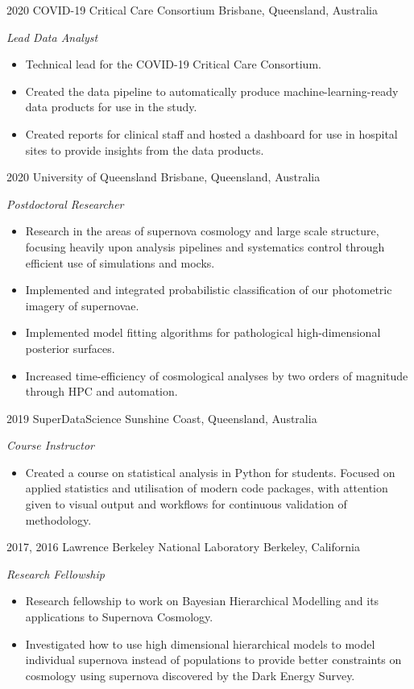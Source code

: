 \begin{entrylist}

\entry
{2020}
{COVID-19 Critical Care Consortium}
{Brisbane, Queensland, Australia}
{\emph{Lead Data Analyst}
\begin{itemize}
	\item Technical lead for the COVID-19 Critical Care Consortium. 
	\item Created the data pipeline to automatically produce machine-learning-ready data products for use in the study. 
	\item Created reports for clinical staff and hosted a dashboard for use in hospital sites to provide insights from the data products.
\end{itemize}
}

\entry
{2020}
{University of Queensland}
{Brisbane, Queensland, Australia}
{\emph{Postdoctoral Researcher}
\begin{itemize}
\item Research in the areas of supernova cosmology and large scale structure, focusing heavily upon analysis pipelines and 
systematics control through efficient use of simulations and mocks.
\item Implemented and integrated probabilistic classification of our photometric imagery of supernovae.
\item Implemented model fitting algorithms for pathological high-dimensional posterior surfaces.
\item Increased time-efficiency of cosmological analyses by two orders of magnitude through HPC and automation.
\end{itemize}
}
\end{entrylist}
\begin{entrylist}
\entry
{2019}
{SuperDataScience}
{Sunshine Coast, Queensland, Australia}
{\emph{Course Instructor}
\begin{itemize}
\item Created a course on statistical analysis in Python for students. 
Focused on applied statistics and utilisation of modern code packages, 
with attention given to visual output and workflows for continuous validation of methodology.
\end{itemize}
}
\end{entrylist}
\begin{entrylist}
\entry
{2017, 2016}
{Lawrence Berkeley National Laboratory}
{Berkeley, California}
{\emph{Research Fellowship}
\begin{itemize}
\item	Research fellowship to work on Bayesian Hierarchical Modelling and its applications to Supernova Cosmology. 
\item	Investigated how to use high dimensional hierarchical models to model individual supernova instead of populations to provide better constraints on cosmology using supernova discovered by the Dark Energy Survey.
\end{itemize}}
\end{entrylist}

